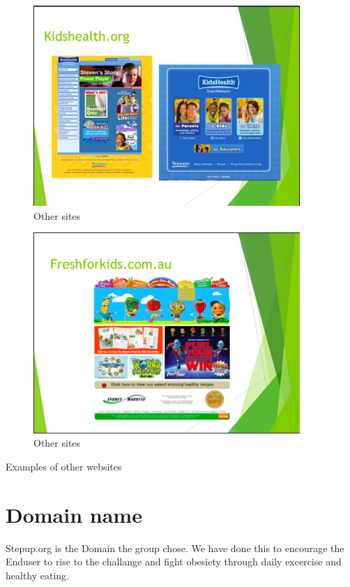\documentclass[letterpaper,12pt]{article}
\begin{document}
\begin{figure}[ht!]
  \centering
  \includegraphics[width=0.9\textwidth]{assets/jpg/othersite_2}
  \caption{Other sites}
  \label{fig:othersites}
\end{figure}
\FloatBarrier

\begin{figure}[ht!]
  \centering
  \includegraphics[width=0.9\textwidth]{assets/jpg/othersite_3}
  \caption{Other sites}
  \label{fig:othersites}
\end{figure}
\FloatBarrier

Examples of other websites

\section{Domain name}

Stepup.org is the Domain the group chose. We have done this to encourage the Enduser to rise to the challange and fight obesiety through daily excercise and healthy eating.
\end{document}
